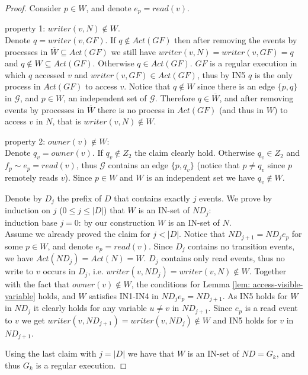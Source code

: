 \begin{proof}	
	Consider $p \in W$, and denote $e_p = read(v)$.
	
	property 1: $writer(v,N) \notin W$.
	\\ Denote $q = writer(v, G F)$. If $q \notin Act (G F)$ then after removing the events by processes in $\overline{W} \subseteq Act(G F)$ we still have $writer(v,N) = writer(v,G F) = q$ and $q \notin W \subseteq Act(G F)$. Otherwise  $q \in Act(G F)$. $G F$ is a regular execution in which $q$ accessed $v$ and $writer(v, G F) \in Act(G F)$, thus by IN5 $q$ is the only process in $Act(G F)$ to access $v$. Notice that $q \notin W$ since there is an edge $\{p,q\}$ in $\mathcal{G}$, and $p \in W$, an independent set of $\mathcal{G}$. Therefore $q \in \overline{W}$, and after removing events by processes in $\overline{W}$ there is no process in $Act(G F)$ (and thus in $W$) to access $v$ in $N$, that is $writer(v,N) \notin W$.
	
	property 2: $owner(v) \notin W$:
	\\ Denote $q_v = owner(v)$. If $q_v \notin Z_2$ the claim clearly hold. Otherwise $q_v \in Z_2$ and $f_p \sim e_p = read(v)$, thus $\mathcal{G}$ contains an edge $\{p,q_v\}$ (notice that $p \neq q_v$ since $p$ remotely reads $v$). Since $p \in W$ and $W$ is an independent set we have $q_v \notin W$.
	
	Denote by $D_j$ the prefix of $D$ that contains exactly $j$ events. We prove by induction on $j$ ($0 \leq j \leq |D|$) that $W$ is an IN-set of $N D_j$:
	\\ induction base $j=0$: by our construction $W$ is an IN-set of $N$.
	\\ Assume we already proved the claim for $j < |D|$. Notice that $N D_{j+1} = N D_j e_p$ for some $p \in W$, and denote $e_p = read(v)$. Since $D_j$ contains no transition events, we have $Act(N D_j) = Act(N) = W$. $D_j$ contains only read events, thus no write to $v$ occurs in $D_j$, i.e. $writer(v, N D_j) = writer(v, N) \notin W$. Together with the fact that $owner(v) \notin W$, the conditions for Lemma \ref{lem: access-visible-variable} holds, and $W$ satisfies IN1-IN4 in $N D_j e_p = N D_{j+1}$. As IN5 holds for $W$ in $N D_j$ it clearly holds for any variable $u \neq v$ in $N D_{j+1}$. Since $e_p$ is a read event to $v$ we get $writer(v, N D_{j+1}) = writer(v, N D_j) \notin W$ and IN5 holds for $v$ in $N D_{j+1}$.
	
	Using the last claim with $j = |D|$ we have that $W$ is an IN-set of $N D = G_k$, and thus $G_k$ is a regular execution.
\end{proof}
	
